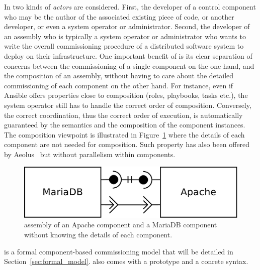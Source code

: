 In \mad two kinds of \emph{actors} are considered. First, the
developer of a control component who may be the author of the
associated existing piece of code, or another developer, or even a
system operator or administrator. Second, the developer of an assembly
who is typically a system operator or administrator who wants to write
the overall commissioning procedure of a distributed software system
to deploy on their infrastructure. One important benefit of \mad is
its clear separation of concerns between the commissioning of a single
component on the one hand, and the composition of an assembly, without
having to care about the detailed commissioning of each component on
the other hand. For instance, even if Ansible offers properties close
to composition (\eg roles, playbooks, tasks etc.), the system operator
still has to handle the correct order of composition. Conversely, the
correct coordination, thus the correct order of execution, is
automatically guaranteed by the \mad semantics and the composition of
the component instances. The composition viewpoint is illustrated in
Figure~\ref{fig:simple} where the details of each component are not
needed for composition. Such property has also been offered by
Aeolus~\cite{} but without parallelism within components.

\begin{figure}[tbp]
  \begin{center}
    \includegraphics[width=0.6\linewidth]{./images/simpleass.pdf}
  \end{center}
  \caption{\mad assembly of an Apache component and a MariaDB
    component without knowing the details of each component.}
  \label{fig:simple}
\end{figure}

\mad is a formal component-based commissioning model that will be
detailed in Section~\ref{sec:formal_model}. \mad also comes with a
prototype and a conrete syntax.



